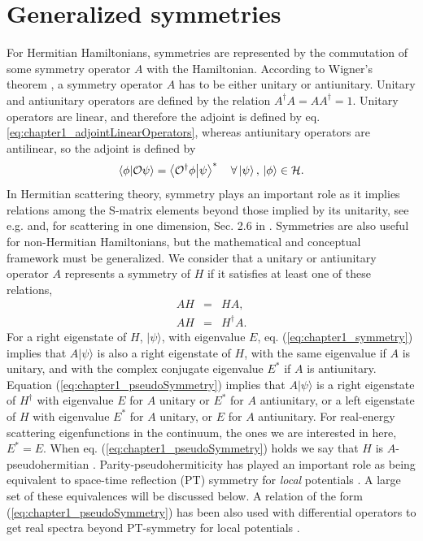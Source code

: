 \section{Generalized symmetries\label{sec:chapter1_generalizedSymmetries}}

For Hermitian  Hamiltonians, symmetries are represented by the commutation of some symmetry operator $A$ with the Hamiltonian. According to Wigner's theorem \cite{Wigner1959}, a symmetry operator $A$ has to be either unitary or antiunitary. Unitary and antiunitary operators are defined by the relation $A^\dagger A = A A^\dagger = 1$. Unitary operators are linear, and therefore the adjoint is defined by eq. \eqref{eq:chapter1_adjointLinearOperators}, whereas antiunitary operators are antilinear, so the adjoint is defined by
%
\begin{equation}
  \braket{\phi}{\mathcal{O}\psi} = \braket{\mathcal{O}^\dagger\phi}{\psi}^*\quad\forall\ket{\psi},\,\ket{\phi}\in\mathcal{H}.
  \label{eq:chapter1_adjointAntiLinearOperators}
\end{equation}
%
In Hermitian scattering theory, symmetry plays an important role  as it implies relations among
the S-matrix elements beyond those implied by its unitarity, see e.g. \cite{Taylor1972} and, for scattering in one dimension, Sec. 2.6 in \cite{Muga2004}. Symmetries are also useful for  non-Hermitian Hamiltonians, but the mathematical and conceptual
framework must be generalized. We consider that a unitary or antiunitary operator $A$ represents a symmetry of $H$ if it satisfies at least one of these relations,
%
\begin{eqnarray}
  AH&=&HA,
  \label{eq:chapter1_symmetry}
  \\
  AH&=&H^\dagger A.
  \label{eq:chapter1_pseudoSymmetry}
\end{eqnarray}
%
For a right eigenstate of $H$, $|\psi\rangle$,
with eigenvalue $E$, eq. (\ref{eq:chapter1_symmetry}) implies that
$A|\psi\rangle$ is also a right  eigenstate of $H$, with the
same eigenvalue if $A$ is unitary, and with the complex conjugate eigenvalue $E^*$ if $A$ is antiunitary.
Equation (\ref{eq:chapter1_pseudoSymmetry}) implies that $A|\psi\rangle$ is a right eigenstate of $H^\dagger$
with eigenvalue $E$ for $A$ unitary or $E^*$ for $A$ antiunitary, or a left eigenstate of $H$ with eigenvalue $E^*$ for $A$ unitary, or $E$
for $A$ antiunitary. For real-energy scattering
eigenfunctions in the continuum, the ones we are interested in here, $E^*=E$.
When eq. (\ref{eq:chapter1_pseudoSymmetry}) holds we say that $H$ is $A$-pseudohermitian \cite{Mostafazadeh2010}.
Parity-pseudohermiticity has played an important role as being equivalent to space-time reflection (PT) symmetry for {\it local} potentials
\cite{Mostafazadeh2010,Znojil2015}. A large set of these equivalences
will be discussed below.
A relation of the form (\ref{eq:chapter1_pseudoSymmetry}) has been also used with differential operators  to get real spectra beyond
PT-symmetry for local potentials  \cite{Nixon2016,Nixon2016a}.

